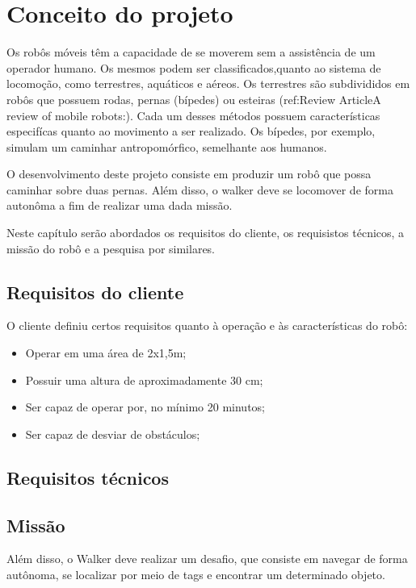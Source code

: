 \chapter{Conceito do projeto}
\label{chap:fundteor}
Os robôs móveis têm a capacidade de se moverem sem a assistência de um operador humano. Os mesmos podem ser classificados,quanto ao sistema de locomoção, como terrestres, aquáticos e aéreos. Os terrestres são subdivididos em robôs que possuem rodas, pernas (bípedes) ou esteiras (ref:Review ArticleA review of mobile robots:). Cada um desses métodos possuem características especifícas quanto ao movimento a ser realizado. Os bípedes, por exemplo, simulam um caminhar antropomórfico, semelhante aos humanos. 

O desenvolvimento deste projeto consiste em produzir um robô que possa caminhar sobre duas pernas. Além disso, o walker deve se locomover de forma autonôma a fim de realizar uma dada missão.

Neste capítulo serão abordados os requisitos do cliente, os requisistos técnicos, a missão do robô e a pesquisa por similares. 



\section{Requisitos do cliente}
 O cliente definiu certos requisitos quanto à operação e  às características do robô:
 \begin{itemize}
    \item Operar em uma área de 2x1,5m;
    \item Possuir uma altura de aproximadamente 30 cm;
    \item Ser capaz de operar por, no mínimo 20 minutos;
    \item Ser capaz de desviar de obstáculos;
 \end{itemize}

 \section{Requisitos técnicos}

 \section{Missão}
 Além disso, o Walker deve realizar um desafio, que consiste em navegar de forma autônoma, se localizar por meio de tags e encontrar um determinado objeto.
